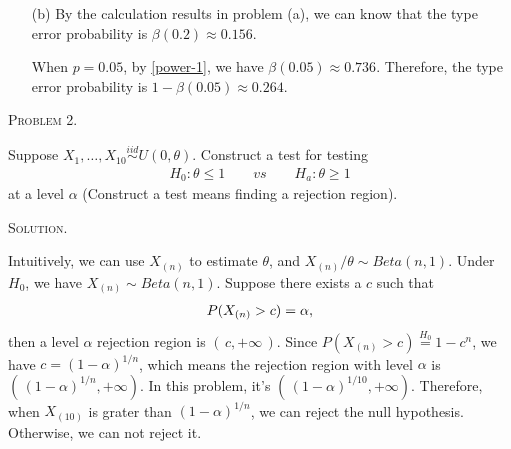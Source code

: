 \documentclass{article}
\newcommand{\RNum}[1]{\uppercase\expandafter{\romannumeral #1\relax}}  %
\begin{document}
\begin{CJK}{UTF8}{gbsn}
\begin{itemize}
\begin{figure}[htbp]
                  \label{power}
              \end{figure}

        \item [(b)]
              By the calculation results in problem (a), we can know that the type \RNum{1} error probability is $\beta(0.2)\approx 0.156$.

              When $p=0.05$, by \eqref{power-1}, we have $\beta(0.05)\approx 0.736$. Therefore, the type \RNum{2}
              error probability is $1-\beta(0.05)\approx0.264$.
    \end{itemize}






    \begin{shaded}
        \noindent\textsc{Problem 2.}\par
        Suppose $X_1, \ldots, X_{10}\mathop{\sim}\limits^{iid} U(0, \theta)$. Construct a test for testing
        \begin{align}
            H_0: \theta \leq 1 \qquad vs \qquad H_a: \theta \geq 1
        \end{align}
        at a level $\alpha$ (Construct a test means finding a rejection region).
    \end{shaded}
    \noindent\textsc{Solution.}\par
    Intuitively, we can use $X_{(n)}$ to estimate $\theta$, and $X_{(n)}/\theta \sim Beta(n, 1)$. Under $H_0$, we
    have $X_{(n)} \sim Beta(n, 1)$. Suppose there exists a $c$ such that
    \begin{align}
        P(X_{(n)} > c) = \alpha, \notag
    \end{align}
    then a level $\alpha$ rejection region is $(\, c, +\infty\,)$. Since $P(X_{(n)} > c) \mathop{=}\limits^{H_0} 1 - c^{n}$, we have
    $c = (1 - \alpha)^{1/n}$, which means the rejection region with level $\alpha$ is $(\, (1 - \alpha)^{1/n}, +\infty)$. In this
    problem, it's $(\, (1 - \alpha)^{1/10}, +\infty)$.
    Therefore, when $X_{(10)}$ is grater than $(1-\alpha)^{1/n}$, we can reject the null hypothesis. Otherwise, we can not
    reject it.




\end{CJK}
\end{document}
